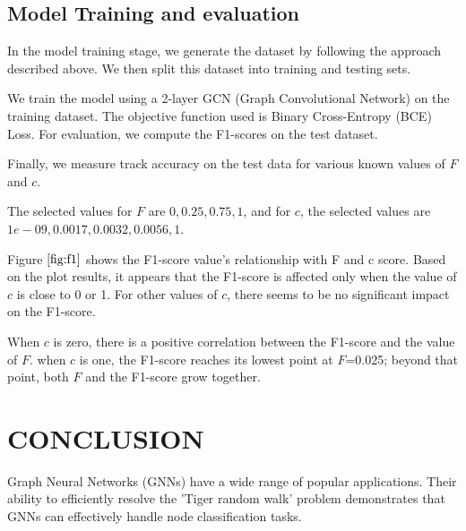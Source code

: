 \documentclass{article}
\begin{document}
  \subsection{Model Training and evaluation}
  \label{ssec:model}

  In the model training stage, we generate the dataset by following the approach described above. We then split this dataset into training and testing sets.

  We train the model using a 2-layer GCN (Graph Convolutional Network) on the training dataset. The objective function used is Binary Cross-Entropy (BCE) Loss.
  For evaluation, we compute the F1-scores on the test dataset.

  Finally, we measure track accuracy on the test data for various known values of $F$ and $c$.

  The selected values for $F$ are $0, 0.25, 0.75, 1$, and for $c$, the selected values are $1e-09, 0.0017, 0.0032, 0.0056, 1$.




Figure $\ref{fig:f1}$ shows the F1-score value's relationship with F and c score.
Based on the plot results, it appears that the F1-score is affected only when the value of $c$ is close to 0 or 1. For other values of $c$, there seems to be no significant impact on the F1-score.

When $c$ is zero, there is a positive correlation between the F1-score and the value of $F$.
when $c$ is one, the F1-score reaches its lowest point at 
$F$=0.025; beyond that point, both $F$ and the F1-score grow together.

\section{CONCLUSION}
\label{sec:conclusion}

Graph Neural Networks (GNNs) have a wide range of popular applications. Their ability to efficiently resolve the 'Tiger random walk' problem demonstrates that GNNs can effectively handle node classification tasks.
\end{document}

